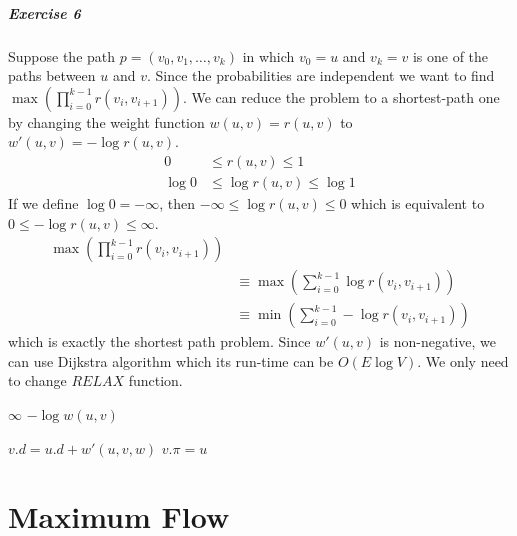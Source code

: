 \documentclass{book}
\begin{document}
	\paragraph{Exercise 6}
	Suppose the path $p = (v_0, v_1, \dots, v_k)$ in which $v_0 = u$ and $v_k = v$ is one of the paths between $u$ and $v$. Since the probabilities are independent we want to find $\max(\prod_{i = 0}^{k - 1}r(v_i, v_{i+1}))$. We can reduce the problem to a shortest-path one by changing the weight function $w(u, v) = r(u, v)$ to $w'(u, v) = -\log{r(u, v)}$.
	\begin{equation*}
	\begin{split}
		0 &\le r(u, v) \le 1 \\
		\log 0 &\le \log{r(u, v)} \le \log 1
	\end{split}
	\end{equation*}
	If we define $\log 0 = -\infty$, then $-\infty \le \log{r(u, v)} \le 0$ which is equivalent to $0 \le -\log{r(u, v)} \le \infty$.
	\begin{equation*}
	\begin{split}
		\max(\prod_{i = 0}^{k - 1}r(v_i, v_{i+1})) \\
		&\equiv \max(\sum_{i = 0}^{k - 1}\log{r(v_i, v_{i+1})}) \\
		&\equiv \min(\sum_{i = 0}^{k - 1}-\log{r(v_i, v_{i+1})})
	\end{split}
	\end{equation*}
	which is exactly the shortest path problem. Since $w'(u, v)$ is non-negative, we can use Dijkstra algorithm which its run-time can be $O(E\log V)$. We only need to change $RELAX$ function.
	\begin{algorithm*}[h!]
		\begin{algorithmic}[1]
					\State \Return $\infty$
				\Else
					\State \Return $-\log{w(u, v)}$
				\EndIf
			\EndFunction
		\end{algorithmic}
	\end{algorithm*}
	\begin{algorithm*}
		\begin{algorithmic}[1]
					\State $v.d = u.d + w'(u, v, w)$
					\State $v.\pi = u$
				\EndIf
			\EndFunction
		\end{algorithmic}
	\end{algorithm*}	
	\FloatBarrier
	\chapter{Maximum Flow}
\end{document}
